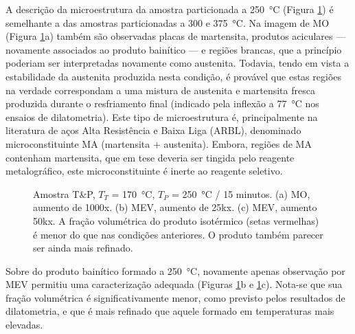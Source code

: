A descrição da microestrutura da amostra particionada a \SI{250}{\degreeCelsius} (Figura \ref{fig:TT170TP250micros}) é semelhante a das amostras particionadas a 300 e \SI{375}{\degreeCelsius}. Na imagem de MO (Figura \ref{fig:TT170TP250micros}a) também são observadas placas de martensita, produtos aciculares --- novamente associados ao produto bainítico --- e regiões brancas, que a princípio poderiam ser interpretadas novamente como austenita. Todavia, tendo em vista a estabilidade da austenita produzida nesta condição, é provável que estas regiões na verdade correspondam a uma mistura de austenita e martensita fresca produzida durante o resfriamento final (indicado pela inflexão a \SI{77}{\degreeCelsius} nos ensaios de dilatometria). Este tipo de microestrutura é, principalmente na literatura de aços Alta Resistência e Baixa Liga (ARBL), denominado microconstituinte MA (martensita + austenita). Embora, regiões de MA contenham martensita, que em tese deveria ser tingida pelo reagente metalográfico, este microconstituinte é inerte ao reagente seletivo. %

\begin{figure}
  \centering
  \quad
  \vspace{0pt}
  \caption{Amostra T\&P, $T_T$ = \SI{170}{\degreeCelsius}, $T_P$ = \SI{250}{\degreeCelsius} / 15 minutos. (a) MO, aumento de 1000x. (b) MEV, aumento de 25kx. (c) MEV, aumento 50kx. A fração volumétrica do produto isotérmico (setas vermelhas) é menor do que nas condições anteriores. O produto também parecer ser ainda mais refinado.}
  \label{fig:TT170TP250micros}
\end{figure}

Sobre do produto bainítico formado a \SI{250}{\degreeCelsius}, novamente apenas observação por MEV permitiu uma caracterização adequada (Figuras \ref{fig:TT170TP250micros}b e \ref{fig:TT170TP250micros}c). Nota-se que sua fração volumétrica é significativamente menor, como previsto pelos resultados de dilatometria, e que é mais refinado que aquele formado em temperaturas mais elevadas.

